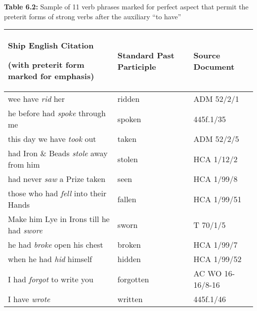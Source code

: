\begin{styleStandard}
\textbf{Table 6.2:} Sample of 11 verb phrases marked for perfect aspect that permit the preterit forms of strong verbs after the auxiliary “to have”
\end{styleStandard}


\begin{flushleft}
\tablehead{}
\begin{supertabular}{m{3.10456in}m{1.0941598in}m{1.5768598in}}
\hline
\textbf{Ship English Citation }

(with preterit form marked for emphasis) &
\textbf{Standard Past Participle} &
\textbf{Source Document}\\\hline
wee have \textit{rid} her &
ridden &
ADM 52/2/1\\
he before had\textit{ spoke} through me  &
spoken &
445f.1/35\\
this day we have \textit{took} out &
taken &
ADM 52/2/5\\
[he] had Iron \& Beads \textit{stole} away from him  &
stolen &
HCA 1/12/2\\
had never \textit{saw} a Prize taken &
seen &
HCA 1/99/8\\
those who had \textit{fell} into their Hands  &
fallen &
HCA 1/99/51\\
Make him Lye in Irons till he had \textit{swore} &
sworn &
T 70/1/5\\
he had \textit{broke }open his chest  &
broken &
HCA 1/99/7\\
when he had \textit{hid} himself &
hidden &
HCA 1/99/52\\
I had \textit{forgot} to write you &
forgotten &
AC WO 16-16/8-16\\
I have \textit{wrote} &
written &
445f.1/46\\\hline
\end{supertabular}
\end{flushleft}
